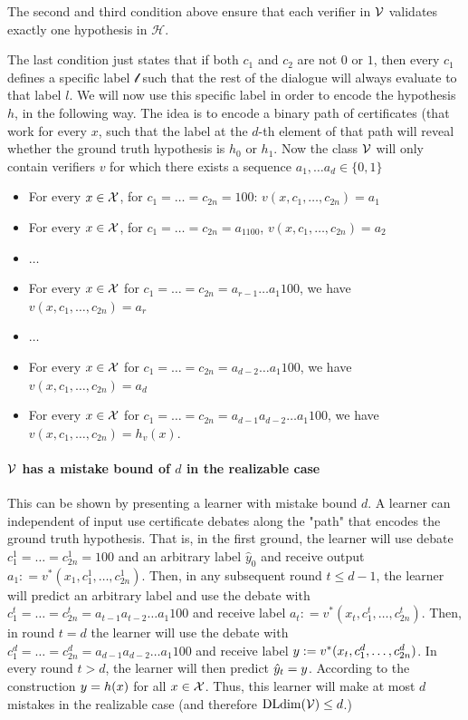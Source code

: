 \documentclass[11pt,letterpaper]{article}
\theoremstyle{definition}
\theoremstyle{plain}
\begin{document}
    The second and third condition above ensure that each verifier in ${\mathcal V}$ validates exactly one hypothesis in $\mathcal{H}$.
    
    The last condition just states that if both $c_1$ and $c_2$ are not $0$ or $1$, then every $c_1$ defines a specific label $\mathcal{l}$ such that the rest of the dialogue will always evaluate to that label $l$.
    We will now use this specific label in order to encode the hypothesis $h$, in the following way.
    The idea is to encode a binary path of certificates (that work for every $x$, such that the label at the $d$-th element of that path will reveal whether the ground truth hypothesis is $h_0$ or $h_1$.
    Now the class ${\mathcal V}$ will only contain verifiers $v$ for which there exists a sequence $a_1, \dots a_d \in \{0,1\}$
    \begin{itemize}
        \item For every $x\in {\mathcal X}$, for $c_1 = \dots =c_{2n} = 100$: $v(x, c_1, \dots, c_{2n}) = a_1$
        \item For every $x\in {\mathcal X}$, for $c_1 = \dots =c_{2n} = a_1100$, $v(x, c_1, \dots, c_{2n}) = a_2$
        \item $\dots$
        \item For every $x \in {\mathcal X}$ for $c_1 = \dots = c_{2n} = a_{r-1} \dots a_1 1 00$, we have $v(x, c_1, \dots, c_{2n}) = a_r$
        \item $\dots$
        \item For every $x \in {\mathcal X}$ for $c_1 = \dots = c_{2n} = a_{d-2} \dots a_1 1 00$, we have $v(x, c_1, \dots, c_{2n}) = a_d$
        \item For every $x \in {\mathcal X}$ for $c_1 = \dots = c_{2n} = a_{d-1} a_{d-2} \dots a_1 1 00$, we have $v(x, c_1, \dots, c_{2n}) = h_v(x)$.
    \end{itemize}
    \paragraph{${\mathcal V}$ has a mistake bound of $d$ in the realizable case} This can be shown by presenting a learner with mistake bound $d$. A learner can independent of input use certificate debates along the "path" that encodes the ground truth hypothesis. That is, in the first ground, the learner will use debate $c_1^1 = \dots = c_{2n}^1 = {100}$ and an arbitrary label $\hat{y}_0$ and receive output $a_1 : = v^* (x_1, c_1^1, \dots, c_{2n}^1)$. Then, in any subsequent round $t \leq d-1$, the learner will predict an arbitrary label and use the debate with $c_{1}^t = \dots = c_{2n}^t  = {a_{t-1} a_{t-2} \dots a_1 1 0 0}$ and receive label $a_{t} : = v^*(x_t,c_1^t, \dots, c_{2n}^t )$. 
 Then, in round $t = d $ the learner will use the debate with $c_{1}^d = \dots = c_{2n}^d  = {a_{d-1} a_{d-2} \dots a_1 1 0 0}$ and receive label $y : = v^*(x_t,c_1^d, \dots, c_{2n}^d )$.
 In every round $t > d$, the learner will then predict $\hat{y}_t= y$. According to the construction $y = h(x)$ for all $x\in {\mathcal X}$. Thus, this learner will make at most $d$ mistakes in the realizable case (and therefore  $\mathrm{DLdim}({\mathcal V}) \leq d$.)
\newcommand{\fat}{\textrm{fat}}
\end{document}
